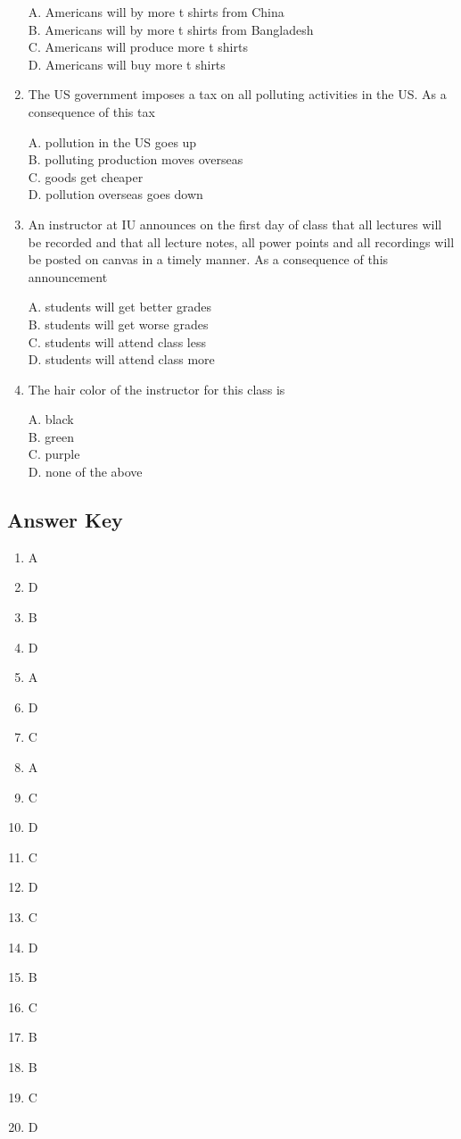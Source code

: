 \documentclass[
]{book}
\providecommand{\tightlist}{%
  \setlength{\itemsep}{0pt}\setlength{\parskip}{0pt}}
\begin{document}
\begin{enumerate}
  A. Americans will by more t shirts from China\\
  B. Americans will by more t shirts from Bangladesh\\
  C. Americans will produce more t shirts\\
  D. Americans will buy more t shirts
\item
  The US government imposes a tax on all polluting activities in the US. As a consequence of this tax

  A. pollution in the US goes up\\
  B. polluting production moves overseas\\
  C. goods get cheaper\\
  D. pollution overseas goes down
\item
  An instructor at IU announces on the first day of class that all lectures will be recorded and that all lecture notes, all power points and all recordings will be posted on canvas in a timely manner. As a consequence of this announcement

  A. students will get better grades\\
  B. students will get worse grades\\
  C. students will attend class less\\
  D. students will attend class more
\item
  The hair color of the instructor for this class is

  A. black\\
  B. green\\
  C. purple\\
  D. none of the above
\end{enumerate}

\hypertarget{answer-key}{%
\subsection{Answer Key}\label{answer-key}}

\begin{enumerate}
\def\labelenumi{\arabic{enumi}.}
\tightlist
\item
  A
\item
  D
\item
  B
\item
  D
\item
  A
\item
  D
\item
  C
\item
  A
\item
  C
\item
  D
\item
  C
\item
  D
\item
  C
\item
  D
\item
  B
\item
  C
\item
  B
\item
  B
\item
  C
\item
  D
\end{enumerate}
\end{document}
